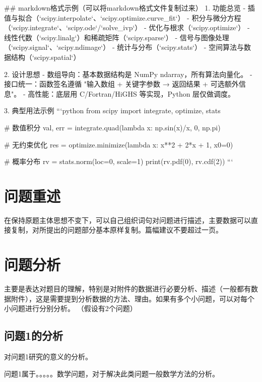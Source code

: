 \documentclass[bwprint]{gmcmthesis}
\begin{document}

\begin{markdown}
## markdown格式示例（可以将markdown格式文件复制过来）
1. 功能总览
   - 插值与拟合（`scipy.interpolate`、`scipy.optimize.curve_fit`）
   - 积分与微分方程（`scipy.integrate`、`scipy.ode`/`solve_ivp`）
   - 优化与根求（`scipy.optimize`）
   - 线性代数（`scipy.linalg`）和稀疏矩阵（`scipy.sparse`）
   - 信号与图像处理（`scipy.signal`、`scipy.ndimage`）
   - 统计与分布（`scipy.stats`）
   - 空间算法与数据结构（`scipy.spatial`）

2. 设计思想
   - 数组导向：基本数据结构是 NumPy ndarray，所有算法向量化。
   - 接口统一：函数签名遵循 "输入数组 + 关键字参数 → 返回结果 + 可选额外信息"。
   - 高性能：底层用 C/Fortran/HiGHS 等实现，Python 层仅做调度。

3. 典型用法示例
   ```python
   from scipy import integrate, optimize, stats
   
   # 数值积分
   val, err = integrate.quad(lambda x: np.sin(x)/x, 0, np.pi)
   
   # 无约束优化
   res = optimize.minimize(lambda x: x**2 + 2*x + 1, x0=0)
   
   # 概率分布
   rv = stats.norm(loc=0, scale=1)
   print(rv.pdf(0), rv.cdf(2))
   ```
\end{markdown}


\section{问题重述}

 
在保持原题主体思想不变下，可以自己组织词句对问题进行描述，主要数据可以直接复制，对所提出的问题部分基本原样复制。篇幅建议不要超过一页。
\section{问题分析}
主要是表达对题目的理解，特别是对附件的数据进行必要分析、描述（一般都有数据附件），这是需要提到分析数据的方法、理由。如果有多个小问题，可以对每个小问题进行分别分析。
（假设有2个问题）



\subsection{问题1的分析}

对问题1研究的意义的分析。

问题1属于。。。。。数学问题，对于解决此类问题一般数学方法的分析。
\end{document}
